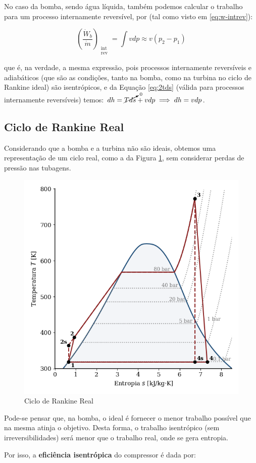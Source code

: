 No caso da bomba, sendo água líquida, também podemos calcular o trabalho para um processo internamente reversível, por (tal como visto em \ref{eq:w-intrev}):

\begin{equation}
    \left( \frac{\dot{W}_b}{\dot{m}} \right)_{\substack{\text{int} \\ \text{rev}}} = \int v dp \approx v (p_2 - p_1)
\end{equation}

que é, na verdade, a mesma expressão, pois processos internamente reversíveis e adiabáticos (que são as condições, tanto na bomba, como na turbina no ciclo de Rankine ideal) são isentrópicos, e da Equação \ref{eq:2tds} (válida para processos internamente reversíveis) temos: $dh = \cancelto{0}{Tds} + vdp \implies dh = vdp$.

\subsection{Ciclo de Rankine Real}

Considerando que a bomba e a turbina não são ideais, obtemos uma representação de um ciclo real, como a da Figura \ref{fig:rankine-Ts-real-powerplant}, sem considerar perdas de pressão nas tubagens.

\begin{figure}[H]
    \centering
    \includegraphics[width=0.45\linewidth]{graphs/rankine-Ts-real-powerplant.png}
    \caption{Ciclo de Rankine Real}
    \label{fig:rankine-Ts-real-powerplant}
\end{figure}

Pode-se pensar que, na bomba, o ideal é fornecer o menor trabalho possível que na mesma atinja o objetivo. Desta forma, o trabalho isentrópico (sem irreversibilidades) será menor que o trabalho real, onde se gera entropia.

Por isso, a \textbf{eficiência isentrópica} do compressor é dada por:

